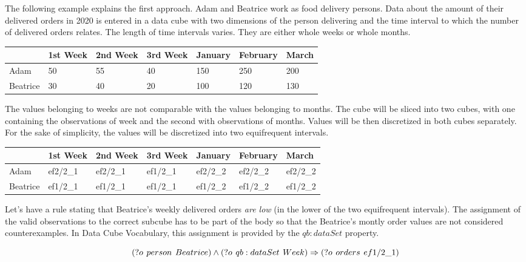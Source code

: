 The following example explains the first approach. Adam and Beatrice work as food delivery persons. Data about the amount of their delivered orders in 2020 is entered in a data cube with two dimensions of the person delivering and the time interval to which the number of delivered orders relates. The length of time intervals varies. They are either whole weeks or whole months.

\begin{table}[h]
\centering
\begin{tabular}{l|llllll}
         & 1st Week & 2nd Week & 3rd Week & January & February & March  \\ 
\hline
Adam     & 50               & 55               & 40               & 150     & 250      & 200    \\
Beatrice & 30               & 40               & 20               & 100     & 120      & 130   
\end{tabular}
\end{table}

The values belonging to weeks are not comparable with the values belonging to months. The cube will be sliced into two cubes, with one containing the observations of week and the second with observations of months. Values will be then discretized in both cubes separately. For the sake of simplicity, the values will be discretized into two equifrequent intervals.

\begin{table}[h]
\centering
\begin{tabular}{l|llllll}
             & 1st Week & 2nd Week & 3rd Week & January  & February & March     \\ 
\hline
Adam     & ef2/2\_1 & ef2/2\_1 & ef1/2\_1 & ef2/2\_2 & ef2/2\_2 & ef2/2\_2  \\
Beatrice & ef1/2\_1 & ef1/2\_1 & ef1/2\_1 & ef1/2\_2 & ef1/2\_2 & ef1/2\_2 
\end{tabular}
\end{table}

Let's have a rule stating that Beatrice's weekly delivered orders \textit{are low} (in the lower of the two equifrequent intervals). The assignment of the valid observations to the correct subcube has to be part of the body so that the Beatrice's montly order values are not considered counterexamples. In Data Cube Vocabulary, this assignment is provided by the $qb:dataSet$ property.

$$ 
(?o\hspace{0.4em}person\hspace{0.4em}Beatrice) \land (?o\hspace{0.4em}qb:dataSet\hspace{0.4em}Week)  \Rightarrow (?o\hspace{0.4em}orders\hspace{0.4em}ef1/2\_1) 
$$

